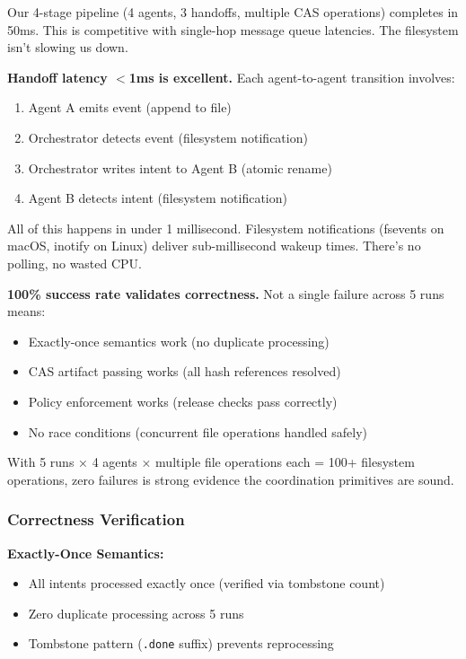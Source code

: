 \documentclass[11pt]{article}
\begin{document}
Our 4-stage pipeline (4 agents, 3 handoffs, multiple CAS operations) completes in 50ms. This is competitive with single-hop message queue latencies. The filesystem isn't slowing us down.

\textbf{Handoff latency $<$1ms is excellent.} Each agent-to-agent transition involves:
\begin{enumerate}
\item Agent A emits event (append to file)
\item Orchestrator detects event (filesystem notification)
\item Orchestrator writes intent to Agent B (atomic rename)
\item Agent B detects intent (filesystem notification)
\end{enumerate}

All of this happens in under 1 millisecond. Filesystem notifications (fsevents on macOS, inotify on Linux) deliver sub-millisecond wakeup times. There's no polling, no wasted CPU.

\textbf{100\% success rate validates correctness.} Not a single failure across 5 runs means:
\begin{itemize}
\item Exactly-once semantics work (no duplicate processing)
\item CAS artifact passing works (all hash references resolved)
\item Policy enforcement works (release checks pass correctly)
\item No race conditions (concurrent file operations handled safely)
\end{itemize}

With 5 runs × 4 agents × multiple file operations each = 100+ filesystem operations, zero failures is strong evidence the coordination primitives are sound.

\subsubsection{Correctness Verification}

\textbf{Exactly-Once Semantics:}
\begin{itemize}
\item All intents processed exactly once (verified via tombstone count)
\item Zero duplicate processing across 5 runs
\item Tombstone pattern (\texttt{.done} suffix) prevents reprocessing
\end{itemize}
\end{document}
